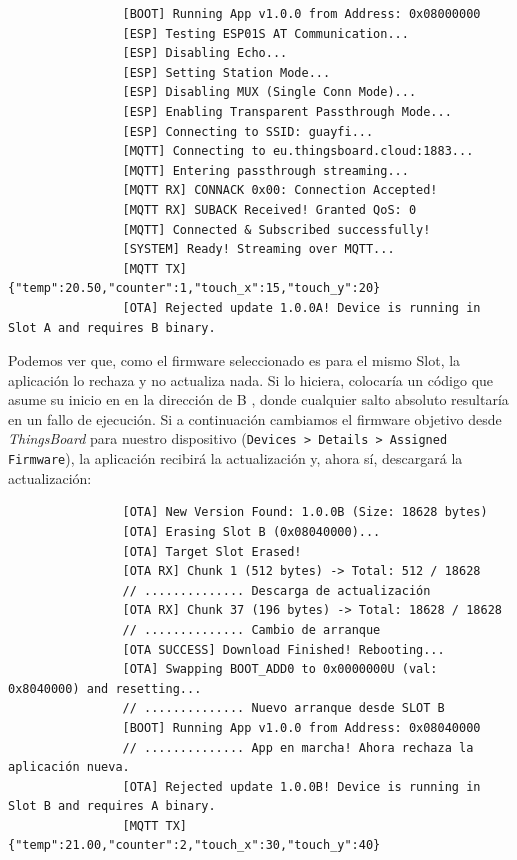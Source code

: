 \documentclass[../main.tex]{subfiles}
\begin{document}
            \begin{lstlisting}
                [BOOT] Running App v1.0.0 from Address: 0x08000000
                [ESP] Testing ESP01S AT Communication...
                [ESP] Disabling Echo...
                [ESP] Setting Station Mode...
                [ESP] Disabling MUX (Single Conn Mode)...
                [ESP] Enabling Transparent Passthrough Mode...
                [ESP] Connecting to SSID: guayfi...
                [MQTT] Connecting to eu.thingsboard.cloud:1883...
                [MQTT] Entering passthrough streaming...
                [MQTT RX] CONNACK 0x00: Connection Accepted!
                [MQTT RX] SUBACK Received! Granted QoS: 0
                [MQTT] Connected & Subscribed successfully!
                [SYSTEM] Ready! Streaming over MQTT...
                [MQTT TX] {"temp":20.50,"counter":1,"touch_x":15,"touch_y":20}
                [OTA] Rejected update 1.0.0A! Device is running in Slot A and requires B binary.
            \end{lstlisting}

            Podemos ver que, como el firmware seleccionado es para el mismo Slot, la aplicación lo rechaza y no actualiza nada. Si lo hiciera, colocaría un código que asume su inicio en  en la dirección de B , donde cualquier salto absoluto resultaría en un fallo de ejecución. Si a continuación cambiamos el firmware objetivo desde \emph{ThingsBoard} para nuestro dispositivo (\texttt{Devices > Details > Assigned Firmware}), la aplicación recibirá la actualización y, ahora sí, descargará la actualización:

            \begin{lstlisting}
                [OTA] New Version Found: 1.0.0B (Size: 18628 bytes)
                [OTA] Erasing Slot B (0x08040000)...
                [OTA] Target Slot Erased!
                [OTA RX] Chunk 1 (512 bytes) -> Total: 512 / 18628
                // .............. Descarga de actualización
                [OTA RX] Chunk 37 (196 bytes) -> Total: 18628 / 18628
                // .............. Cambio de arranque
                [OTA SUCCESS] Download Finished! Rebooting...
                [OTA] Swapping BOOT_ADD0 to 0x0000000U (val: 0x8040000) and resetting...
                // .............. Nuevo arranque desde SLOT B
                [BOOT] Running App v1.0.0 from Address: 0x08040000
                // .............. App en marcha! Ahora rechaza la aplicación nueva.
                [OTA] Rejected update 1.0.0B! Device is running in Slot B and requires A binary.
                [MQTT TX] {"temp":21.00,"counter":2,"touch_x":30,"touch_y":40}
            \end{lstlisting}
\end{document}
